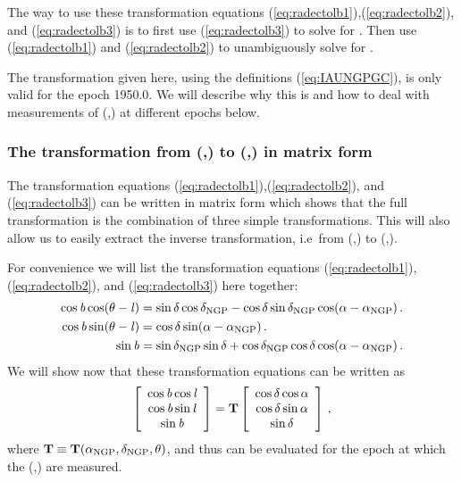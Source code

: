 The way to use these transformation equations
(\ref{eq:radectolb1}),(\ref{eq:radectolb2}), and (\ref{eq:radectolb3})
is to first use (\ref{eq:radectolb3}) to solve for \galb. Then use
(\ref{eq:radectolb1}) and (\ref{eq:radectolb2}) to unambiguously solve
for \gall.

The transformation given here, using the definitions
(\ref{eq:IAUNGPGC}), is only valid for the epoch 1950.0. We will
describe why this is and how to deal with measurements of
(\ra,\dec) at different epochs below.

\subsubsection{The transformation from (\ra,\dec) to (\gall,\galb) in matrix form}

The transformation equations
(\ref{eq:radectolb1}),(\ref{eq:radectolb2}), and (\ref{eq:radectolb3})
can be written in matrix form which shows that the full transformation
is the combination of three simple transformations. This will also
allow us to easily extract the inverse transformation, i.e~from
(\gall,\galb) to (\ra,\dec).

For convenience we will list the transformation equations
(\ref{eq:radectolb1}),(\ref{eq:radectolb2}), and (\ref{eq:radectolb3}) here together:
\begin{align}\label{eq:radectolb}
\cos{\it b} \cos(\theta-{\it l}) &= \sin\delta \cos\delta_{\textnormal{NGP}} - \cos\delta \sin\delta_{\textnormal{NGP}} \cos(\alpha-\alpha_{\textnormal{NGP}})\, .\nonumber\\
\cos {\it b} \sin(\theta-{\it l})&= \cos \delta \sin (\alpha-\alpha_{\textnormal{NGP}})\, .\nonumber\\
\sin {\it b} &= \sin \delta_{\textnormal{NGP}} \sin \delta + \cos\delta_{\textnormal{NGP}} \cos\delta \cos(\alpha-\alpha_{\textnormal{NGP}})\, .
\end{align}
We will show now that these transformation equations can be written as
\begin{equation}\label{eq:radectolbmatrix}
\left[ \begin{array}{c} \cos {\it b} \cos {\it l} \\ \cos {\it b} \sin {\it l} \\ \sin {\it b} \end{array} \right] =
\mathbf{T} \left[ \begin{array}{c} \cos \delta \cos \alpha \\ \cos \delta \sin \alpha \\ \sin \delta \end{array} \right]\, ,
\end{equation}
where $\mathbf{T} \equiv \mathbf{T}(\alpha_{\textnormal{NGP}},\delta_{\textnormal{NGP}},\theta)$, and thus can be
evaluated for the epoch at which the (\ra,\dec) are measured.

